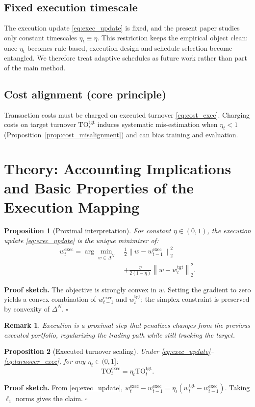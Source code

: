 \documentclass[10pt,twocolumn]{article}
\newtheorem{proposition}{Proposition}
\newtheorem{remark}{Remark}
\newcommand{\wexec}{w^{\mathrm{exec}}}
\newcommand{\wtgt}{w^{\mathrm{tgt}}}
\newcommand{\TOexec}{\mathrm{TO}^{\mathrm{exec}}}
\newcommand{\TOtgt}{\mathrm{TO}^{\mathrm{tgt}}}
\newcommand{\normtwo}[1]{\left\lVert #1 \right\rVert_2}
\newcommand{\DeltaN}{\Delta^N}
\begin{document}
\subsection{Fixed execution timescale}
The execution update \eqref{eq:exec_update} is fixed, and the present paper studies only constant timescales $\eta_t\equiv\eta$. This restriction keeps the empirical object clean: once $\eta_t$ becomes rule-based, execution design and schedule selection become entangled. We therefore treat adaptive schedules as future work rather than part of the main method.

\subsection{Cost alignment (core principle)}
Transaction costs must be charged on executed turnover \eqref{eq:cost_exec}. Charging costs on target turnover $\TOtgt_t$ induces systematic mis-estimation when $\eta_t<1$ (Proposition~\ref{prop:cost_misalignment}) and can bias training and evaluation.

\section{Theory: Accounting Implications and Basic Properties of the Execution Mapping}
\label{sec:theory}

\begin{proposition}[Proximal interpretation]\label{prop:prox}
For constant $\eta\in(0,1)$, the execution update \eqref{eq:exec_update} is the unique minimizer of:
\[
\begin{aligned}
\wexec_t=\arg\min_{w \in \DeltaN}\;
&\frac{1}{2}\normtwo{w-\wexec_{t-1}}^2 \\
&+ \frac{\eta}{2(1-\eta)}\normtwo{w-\wtgt_t}^2.
\end{aligned}
\]
\end{proposition}
\noindent\textbf{Proof sketch.} The objective is strongly convex in $w$. Setting the gradient to zero yields a convex combination of $\wexec_{t-1}$ and $\wtgt_t$; the simplex constraint is preserved by convexity of $\DeltaN$. \hfill$\square$
\begin{remark}
Execution is a proximal step that penalizes \emph{changes from the previous executed portfolio}, regularizing the trading path while still tracking the target.
\end{remark}

\begin{proposition}[Executed turnover scaling]\label{prop:turnover_scaling}
Under \eqref{eq:exec_update}--\eqref{eq:turnover_exec}, for any $\eta_t\in(0,1]$:
\[
\TOexec_t = \eta_t \TOtgt_t.
\]
\end{proposition}
\noindent\textbf{Proof sketch.} From \eqref{eq:exec_update},
$\wexec_t-\wexec_{t-1}=\eta_t(\wtgt_t-\wexec_{t-1})$.
Taking $\ell_1$ norms gives the claim. \hfill$\square$
\end{document}
